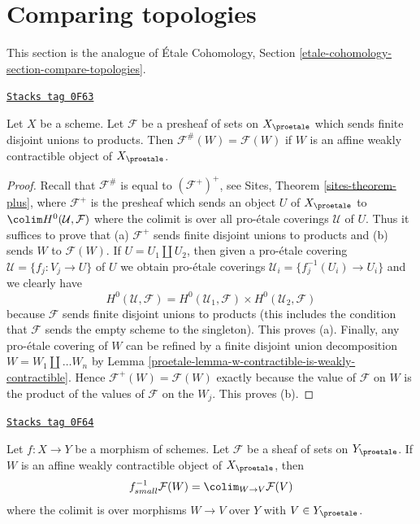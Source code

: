 \section{Comparing topologies}
\label{proetale-section-compare-topologies}
This section is the analogue of
\'Etale Cohomology, Section \ref{etale-cohomology-section-compare-topologies}.

\begin{lemma}
\label{proetale-lemma-presheaf-value-weakly-contractible}
\href{https://stacks.math.columbia.edu/tag/0F63}{\texttt{Stacks tag 0F63}}

Let $X$ be a scheme. Let $\mathcal{F}$ be a presheaf of sets on $X_\proetale$
which sends finite disjoint unions to products. Then
$\mathcal{F}^\#(W) = \mathcal{F}(W)$ if $W$ is an affine weakly contractible
object of $X_\proetale$.
\end{lemma}

\begin{proof}

Recall that $\mathcal{F}^\#$ is equal to $(\mathcal{F}^+)^+$, see
Sites, Theorem \ref{sites-theorem-plus}, where $\mathcal{F}^+$
is the presheaf which sends an object $U$ of $X_\proetale$ to
$\colim H^0(\mathcal{U}, \mathcal{F})$ where the colimit is
over all pro-\'etale coverings $\mathcal{U}$ of $U$.
Thus it suffices to prove that (a) $\mathcal{F}^+$ sends finite
disjoint unions to products and (b) sends $W$ to $\mathcal{F}(W)$.
If $U = U_1 \amalg U_2$, then given a pro-\'etale covering
$\mathcal{U} = \{f_j : V_j \to U\}$ of $U$ we obtain pro-\'etale coverings
$\mathcal{U}_i = \{f_j^{-1}(U_i) \to U_i\}$ and we clearly have
$$
H^0(\mathcal{U}, \mathcal{F}) =
H^0(\mathcal{U}_1, \mathcal{F}) \times
H^0(\mathcal{U}_2, \mathcal{F})
$$
because $\mathcal{F}$ sends finite disjoint unions to products (this includes
the condition that $\mathcal{F}$ sends the empty scheme to the singleton).
This proves (a).
Finally, any pro-\'etale covering of $W$ can be refined by a finite disjoint
union decomposition $W = W_1 \amalg \ldots W_n$ by
Lemma \ref{proetale-lemma-w-contractible-is-weakly-contractible}.
Hence $\mathcal{F}^+(W) = \mathcal{F}(W)$ exactly because the value of
$\mathcal{F}$ on $W$ is the product of the values of $\mathcal{F}$
on the $W_j$. This proves (b).
\end{proof}

\begin{lemma}
\label{proetale-lemma-small-pullback-weakly-contractible}
\href{https://stacks.math.columbia.edu/tag/0F64}{\texttt{Stacks tag 0F64}}

Let $f : X \to Y$ be a morphism of schemes. Let $\mathcal{F}$ be a sheaf
of sets on $Y_\proetale$. If $W$ is an affine weakly contractible
object of $X_\proetale$, then
$$
f_{small}^{-1}\mathcal{F}(W) = \colim_{W \to V} \mathcal{F}(V)
$$
where the colimit is over morphisms $W \to V$ over $Y$
with $V \in Y_\proetale$.
\end{lemma}

